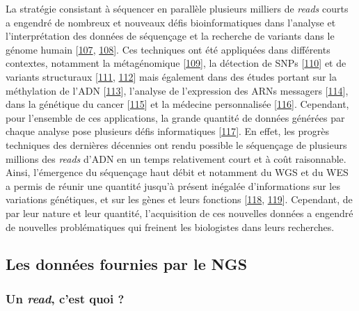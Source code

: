 \documentclass[12pt,twoside]{reedthesis}
\theoremstyle{definition}
\theoremstyle{definition}
\theoremstyle{remark}
\begin{document}
  La stratégie consistant à séquencer en parallèle plusieurs milliers de
  \emph{reads} courts a engendré de nombreux et nouveaux défis
  bioinformatiques dans l'analyse et l'interprétation des données de
  séquençage et la recherche de variants dans le génome humain
  {[}\protect\hyperlink{ref-Wold2007}{107},
  \protect\hyperlink{ref-Yang2009}{108}{]}. Ces techniques ont été
  appliquées dans différents contextes, notamment la métagénomique
  {[}\protect\hyperlink{ref-Qin2010}{109}{]}, la détection de SNPs
  {[}\protect\hyperlink{ref-VanTassell2008}{110}{]} et de variants
  structuraux {[}\protect\hyperlink{ref-Alkan2010}{111},
  \protect\hyperlink{ref-Medvedev2009}{112}{]} mais également dans des
  études portant sur la méthylation de l'ADN
  {[}\protect\hyperlink{ref-Taylor2007}{113}{]}, l'analyse de l'expression
  des ARNs messagers {[}\protect\hyperlink{ref-Sultan2008}{114}{]}, dans
  la génétique du cancer {[}\protect\hyperlink{ref-Guffanti2009}{115}{]}
  et la médecine personnalisée
  {[}\protect\hyperlink{ref-Auffray2009}{116}{]}. Cependant, pour
  l'ensemble de ces applications, la grande quantité de données générées
  par chaque analyse pose plusieurs défis informatiques
  {[}\protect\hyperlink{ref-Horner2009}{117}{]}. En effet, les progrès
  techniques des dernières décennies ont rendu possible le séquençage de
  plusieurs millions des \emph{reads} d'ADN en un temps relativement court
  et à coût raisonnable. Ainsi, l'émergence du séquençage haut débit et
  notamment du WGS et du WES a permis de réunir une quantité jusqu'à
  présent inégalée d'informations sur les variations génétiques, et sur
  les gènes et leurs fonctions {[}\protect\hyperlink{ref-Mardis2008}{118},
  \protect\hyperlink{ref-Bentley2006}{119}{]}. Cependant, de par leur
  nature et leur quantité, l'acquisition de ces nouvelles données a
  engendré de nouvelles problématiques qui freinent les biologistes dans
  leurs recherches.
  
  \subsection{Les données fournies par le
  NGS}\label{les-donnees-fournies-par-le-ngs}
  
  \subsubsection{\texorpdfstring{Un \emph{read}, c'est quoi
  ?}{Un read, c'est quoi ?}}\label{un-read-cest-quoi}
  
\end{document}
